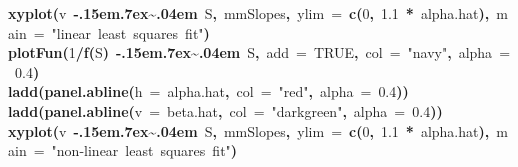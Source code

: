 \documentclass{article}\usepackage{graphicx, color}
\makeatletter
\newcommand{\hlnumber}[1]{\textcolor[rgb]{0,0,0}{#1}}%
\newcommand{\hlfunctioncall}[1]{\textcolor[rgb]{0.501960784313725,0,0.329411764705882}{\textbf{#1}}}%
\newcommand{\hlstring}[1]{\textcolor[rgb]{0.6,0.6,1}{#1}}%
\newcommand{\hlkeyword}[1]{\textcolor[rgb]{0,0,0}{\textbf{#1}}}%
\newcommand{\hlargument}[1]{\textcolor[rgb]{0.690196078431373,0.250980392156863,0.0196078431372549}{#1}}%
\newcommand{\hlsymbol}[1]{\textcolor[rgb]{0,0,0}{#1}}%
\def\urltilda{\kern -.15em\lower .7ex\hbox{\~{}}\kern .04em}%
\newcommand{\hlstd}[1]{\textcolor[rgb]{0,0,0}{#1}}%
\newenvironment{kframe}{%
 \def\FrameCommand##1{\hskip\@totalleftmargin \hskip-\fboxsep
 \colorbox{shadecolor}{##1}\hskip-\fboxsep
     \hskip-\linewidth \hskip-\@totalleftmargin \hskip\columnwidth}%
 \MakeFramed {\advance\hsize-\width
   \@totalleftmargin\z@ \linewidth\hsize
   \@setminipage}}%
 {\par\unskip\endMakeFramed}
\newenvironment{knitrout}{}{} %
\makeatother
\begin{document}
\begin{knitrout}
\color{fgcolor}\begin{kframe}
\begin{flushleft}
\ttfamily\noindent
\hlfunctioncall{xyplot}\hlkeyword{(}\hlsymbol{v}{\ }\hlkeyword{\urltilda{}}{\ }\hlsymbol{S}\hlkeyword{,}{\ }\hlsymbol{mmSlopes}\hlkeyword{,}{\ }\hlargument{ylim}{\ }\hlargument{=}{\ }\hlfunctioncall{c}\hlkeyword{(}\hlnumber{0}\hlkeyword{,}{\ }\hlnumber{1.1}{\ }\hlkeyword{*}{\ }\hlsymbol{alpha.hat}\hlkeyword{)}\hlkeyword{,}{\ }\hlargument{main}{\ }\hlargument{=}{\ }\hlstring{"{}{}linear{\ }least{\ }squares{\ }fit"{}{}}\hlkeyword{)}\hspace*{\fill}\\
\hlstd{}\hlfunctioncall{plotFun}\hlkeyword{(}\hlnumber{1}\hlkeyword{/}\hlfunctioncall{f}\hlkeyword{(}\hlsymbol{S}\hlkeyword{)}{\ }\hlkeyword{\urltilda{}}{\ }\hlsymbol{S}\hlkeyword{,}{\ }\hlargument{add}{\ }\hlargument{=}{\ }\hlnumber{TRUE}\hlkeyword{,}{\ }\hlargument{col}{\ }\hlargument{=}{\ }\hlstring{"{}{}navy"{}{}}\hlkeyword{,}{\ }\hlargument{alpha}{\ }\hlargument{=}{\ }\hlnumber{0.4}\hlkeyword{)}\hspace*{\fill}\\
\hlstd{}\hlfunctioncall{ladd}\hlkeyword{(}\hlfunctioncall{panel.abline}\hlkeyword{(}\hlargument{h}{\ }\hlargument{=}{\ }\hlsymbol{alpha.hat}\hlkeyword{,}{\ }\hlargument{col}{\ }\hlargument{=}{\ }\hlstring{"{}{}red"{}{}}\hlkeyword{,}{\ }\hlargument{alpha}{\ }\hlargument{=}{\ }\hlnumber{0.4}\hlkeyword{)}\hlkeyword{)}\hspace*{\fill}\\
\hlstd{}\hlfunctioncall{ladd}\hlkeyword{(}\hlfunctioncall{panel.abline}\hlkeyword{(}\hlargument{v}{\ }\hlargument{=}{\ }\hlsymbol{beta.hat}\hlkeyword{,}{\ }\hlargument{col}{\ }\hlargument{=}{\ }\hlstring{"{}{}darkgreen"{}{}}\hlkeyword{,}{\ }\hlargument{alpha}{\ }\hlargument{=}{\ }\hlnumber{0.4}\hlkeyword{)}\hlkeyword{)}\hspace*{\fill}\\
\hlstd{}\hlfunctioncall{xyplot}\hlkeyword{(}\hlsymbol{v}{\ }\hlkeyword{\urltilda{}}{\ }\hlsymbol{S}\hlkeyword{,}{\ }\hlsymbol{mmSlopes}\hlkeyword{,}{\ }\hlargument{ylim}{\ }\hlargument{=}{\ }\hlfunctioncall{c}\hlkeyword{(}\hlnumber{0}\hlkeyword{,}{\ }\hlnumber{1.1}{\ }\hlkeyword{*}{\ }\hlsymbol{alpha.hat}\hlkeyword{)}\hlkeyword{,}{\ }\hlargument{main}{\ }\hlargument{=}{\ }\hlstring{"{}{}non-linear{\ }least{\ }squares{\ }fit"{}{}}\hlkeyword{)}\hspace*{\fill}\\

\end{flushleft}
\end{kframe}
\end{knitrout}
\end{document}
